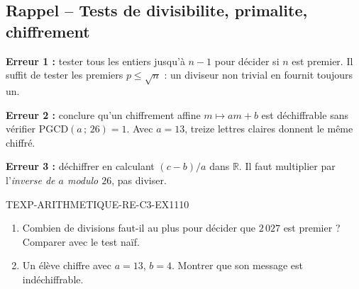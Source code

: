 

\subsection*{Rappel -- Tests de divisibilite, primalite, chiffrement}

\textbf{Erreur 1 :} tester tous les entiers jusqu'à $n-1$ pour décider si $n$
est premier. Il suffit de tester les premiers $p\leq\sqrt{n}$ : un diviseur
non trivial en fournit toujours un.

\textbf{Erreur 2 :} conclure qu'un chiffrement affine $m\mapsto am+b$ est
déchiffrable sans vérifier $\mathrm{PGCD}(a\,;\,26)=1$. Avec $a=13$, treize
lettres claires donnent le même chiffré.

\textbf{Erreur 3 :} déchiffrer en calculant $(c-b)/a$ dans $\mathbb{R}$. Il
faut multiplier par l'\emph{inverse de $a$ modulo $26$}, pas diviser.


\begin{exercice}{TEXP-ARITHMETIQUE-RE-C3-EX1}{1}{10}
\begin{enumerate}
  \item Combien de divisions faut-il au plus pour décider que $2\,027$ est
        premier ? Comparer avec le test naïf.
  \item Un élève chiffre avec $a=13$, $b=4$. Montrer que son message est
        indéchiffrable.
\end{enumerate}
\end{exercice}
